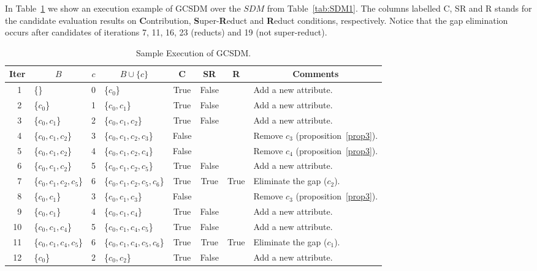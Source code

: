 \documentclass[authoryear,11pt]{elsarticle}
\begin{document}
	In Table~\ref{tab:sample_GCSDM} we show an execution example of GCSDM over the $SDM$ from Table~\ref{tab:SDM1}.
	The columns labelled C, SR and R stands for the candidate evaluation results on \textbf{C}ontribution, 
	\textbf{S}uper-\textbf{R}educt and \textbf{R}educt conditions, respectively. Notice that the gap elimination 
	occurs after candidates of iterations 7, 11, 16, 23 (reducts) and 19 (not super-reduct).
	
	\begin{table}[!htb]
		\caption{Sample Execution of GCSDM.}\label{tab:sample_GCSDM}
      	\centering
    		\begin{tabular}{|c|l|c|l|c|c|c|l|}
    		\hline
    		Iter & \multicolumn{1}{c|}{$B$} & $c$ & \multicolumn{1}{c|}{$B\cup \lbrace c\rbrace$} 
    		& C & SR & R & \multicolumn{1}{c|}{Comments}\\
    		\hline
    		~1 & \{\} 					& 0 & \{$c_0$\} 					& True & False &   & Add a new attribute.\\
    		~2 & \{$c_0$\} 				& 1 & \{$c_0,c_1$\}				& True & False &   & Add a new attribute.\\
    		~3 & \{$c_0,c_1$\} 			& 2 & \{$c_0,c_1,c_2$\}			& True & False &   & Add a new attribute.\\
    		~4 & \{$c_0,c_1,c_2$\} 		& 3 & \{$c_0,c_1,c_2,c_3$\}		& False &   &   & Remove $c_3$ (proposition~\ref{prop3}).\\
    		~5 & \{$c_0,c_1,c_2$\} 		& 4 & \{$c_0,c_1,c_2,c_4$\}		& False &   &   & Remove $c_4$ (proposition~\ref{prop3}).\\
    		~6 & \{$c_0,c_1,c_2$\}		& 5 & \{$c_0,c_1,c_2,c_5$\}		& True & False &   & Add a new attribute.\\
    		~7 & \{$c_0,c_1,c_2,c_5$\}	& 6 & \{$c_0,c_1,c_2,c_5,c_6$\} 	& True & True & True & Eliminate the gap ($c_2$).\\
    		~8 & \{$c_0,c_1$\} 			& 3 & \{$c_0,c_1,c_3$\}			& False &   &   & Remove $c_3$ (proposition~\ref{prop3}).\\
    		~9 & \{$c_0,c_1$\}			& 4 & \{$c_0,c_1,c_4$\}			& True & False &   & Add a new attribute.\\
    		10 & \{$c_0,c_1,c_4$\}		& 5 & \{$c_0,c_1,c_4,c_5$\}		& True & False &   & Add a new attribute.\\
    		11 & \{$c_0,c_1,c_4,c_5$\}	& 6 & \{$c_0,c_1,c_4,c_5,c_6$\} 	& True & True & True & Eliminate the gap ($c_1$).\\
    		12 & \{$c_0$\} 				& 2 & \{$c_0,c_2$\}				& True & False &   & Add a new attribute.\\

\end{tabular}
\end{table}
\end{document}
